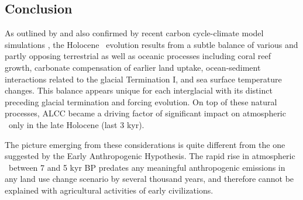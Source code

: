 \subsection*{Conclusion}
As outlined by \citet{elsig} and also confirmed by recent carbon cycle-climate model simulations \citep{menvieljoos12}, the Holocene \coo\ evolution results from a subtle balance of various and partly opposing terrestrial as well as oceanic processes including coral reef growth, carbonate compensation of earlier land uptake, ocean-sediment interactions related to the glacial Termination I, and sea surface temperature changes. This balance appears unique for each interglacial with its distinct preceding glacial termination and forcing evolution. On top of these natural processes, ALCC became a driving factor of significant impact on atmospheric \coo\ only in the late Holocene (last 3 kyr). 

The picture emerging from these considerations is quite different from the one suggested by the Early Anthropogenic Hypothesis. The rapid rise in atmospheric \coo\ between 7 and 5 kyr BP predates any meaningful anthropogenic emissions in any land use change scenario by several thousand years, and therefore cannot be explained with agricultural activities of early civilizations.
